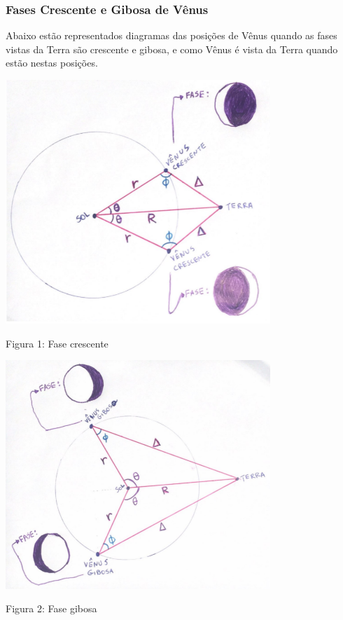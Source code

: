 \documentclass[a4paper, 12pt]{article}
\begin{document}
\subsubsection{Fases Crescente e Gibosa de Vênus}

Abaixo estão representados diagramas das posições de Vênus quando as fases vistas da Terra são crescente e gibosa, e como Vênus é vista da Terra quando estão nestas posições.

\begin{center}
    \includegraphics[width=10cm]{01-crescente.PNG}
    
    Figura 1: Fase crescente
\end{center}

\begin{center}
    \includegraphics[width=10cm]{02-gibosa.PNG}
    
    Figura 2: Fase gibosa
\end{center}
\end{document}
